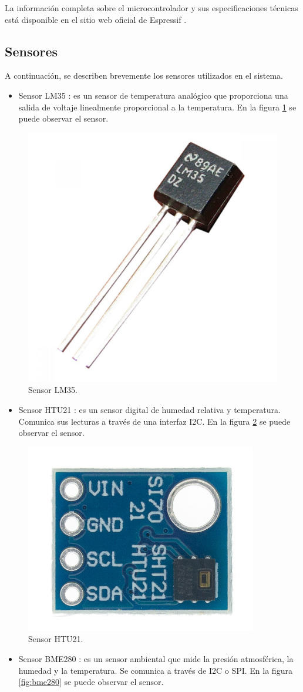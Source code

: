 La información completa sobre el microcontrolador y sus especificaciones técnicas está disponible en el sitio web oficial de Espressif \citep{docsesp32c3}.

\subsection{Sensores}

A continuación, se describen brevemente los sensores utilizados en el sistema.

\begin{itemize}
    \item Sensor LM35 \citep{sensor_lm35}: es un sensor de temperatura analógico que proporciona una salida de voltaje linealmente proporcional a la temperatura. En la figura \ref{fig:lm35} se puede observar el sensor.
\end{itemize}

\begin{figure}[H]
	\centering
	\includegraphics[width=.2\textwidth]{./Figures/sensor_lm35.png}
	\caption{Sensor LM35.}
	\label{fig:lm35}
\end{figure}

\begin{itemize}
	\item Sensor HTU21 \citep{sensor_htu21}: es un sensor digital de humedad relativa y temperatura. Comunica sus lecturas a través de una interfaz I2C. En la figura \ref{fig:htu21} se puede observar el sensor.
\end{itemize}

\begin{figure}[H]
    \centering
    \includegraphics[width=.2\textwidth]{./Figures/sensor_htu21.png}
    \caption{Sensor HTU21.}
    \label{fig:htu21}
\end{figure}

\begin{itemize}
	\item Sensor BME280 \citep{sensor_bme280}: es un sensor ambiental que mide la presión atmosférica, la humedad y la temperatura. Se comunica a través de I2C o SPI. En la figura \ref{fig:bme280} se puede observar el sensor.
\end{itemize}

